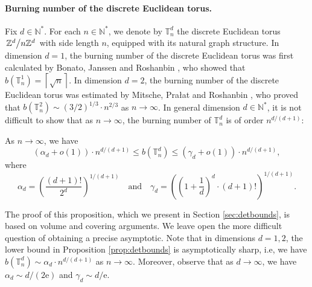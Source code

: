 \documentclass[a4paper,11pt]{article}
\begin{document}
\paragraph{Burning number of the discrete Euclidean torus.}
Fix $d\in\mathbb{N}^*$.
For each ${n\in\mathbb{N}^*}$, we denote by $\mathbb{T}_n^d$ the discrete Euclidean torus $\left.\mathbb{Z}^d\middle/n\mathbb{Z}^d\right.$ with side length $n$, equipped with its natural graph structure.
In dimension $d=1$, the burning number of the discrete Euclidean torus was first calculated by Bonato, Janssen and Roshanbin \cite[Corollary 2.10]{bonatojanssenroshanbin}, who showed that ${b\left(\mathbb{T}_n^1\right)=\left\lceil\sqrt{n}\right\rceil}$.
In dimension $d=2$, the burning number of the discrete Euclidean torus was estimated by Mitsche, Pra\l{}at and Roshanbin
\cite[Corollary 4.1]{mitschepralatroshanbin}, who proved that ${b\left(\mathbb{T}_n^2\right)\sim\left(3/2\right)^{1/3}\cdot n^{2/3}}$ as $n\to\infty$.
In general dimension $d\in\mathbb{N}^*$, it is not difficult to show that as $n\to\infty$, the burning number of $\mathbb{T}_n^d$ is of order $n^{d/(d+1)}$:

\begin{prop}\label{prop:detbounds}
As $n\to\infty$, we have
\[\left(\alpha_d+o(1)\right)\cdot n^{d/(d+1)}\leq b\left(\mathbb{T}_n^d\right)\leq\left(\gamma_d+o(1)\right)\cdot n^{d/(d+1)},\]
where
\[\alpha_d=\left(\frac{(d+1)!}{2^d}\right)^{1/(d+1)}\quad\text{and}\quad\gamma_d=\left(\left(1+\frac{1}{d}\right)^d\cdot(d+1)!\right)^{1/(d+1)}.\]
\end{prop}

The proof of this proposition, which we present in Section \ref{sec:detbounds}, is based on volume and covering arguments.
We leave open the more difficult question of obtaining a precise asymptotic.
Note that in dimensions $d=1,2$, the lower bound in Proposition \ref{prop:detbounds} is asymptotically sharp, i.e, we have $b\left(\mathbb{T}_n^d\right)\sim\alpha_d\cdot n^{d/(d+1)}$ as $n\to\infty$.
Moreover, observe that as $d\to\infty$, we have $\alpha_d\sim d/(2\mathrm{e})$ and $\gamma_d\sim d/\mathrm{e}$.
\end{document}
